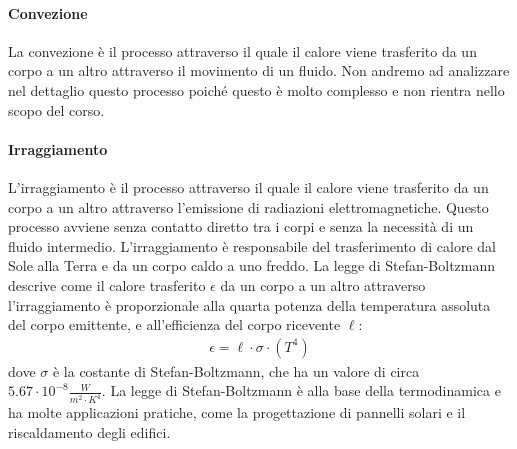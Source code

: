                 \paragraph{Convezione}
                    La convezione è il processo attraverso il quale il calore viene trasferito da un corpo a un altro attraverso il movimento di un fluido. Non andremo ad analizzare nel dettaglio questo processo poiché questo è molto complesso e non rientra nello scopo del corso.
                \paragraph{Irraggiamento}
                    L'irraggiamento è il processo attraverso il quale il calore viene trasferito da un corpo a un altro attraverso l'emissione di radiazioni elettromagnetiche. Questo processo avviene senza contatto diretto tra i corpi e senza la necessità di un fluido intermedio. L'irraggiamento è responsabile del trasferimento di calore dal Sole alla Terra e da un corpo caldo a uno freddo. La legge di Stefan-Boltzmann descrive come il calore trasferito $\epsilon$ da un corpo a un altro attraverso l'irraggiamento è proporzionale alla quarta potenza della temperatura assoluta del corpo emittente, e all'efficienza del corpo ricevente $\ell$:
                    \begin{align*}
                        \epsilon = \ell \cdot \sigma \cdot (T^4)
                    \end{align*}
                    dove $\sigma$ è la costante di Stefan-Boltzmann, che ha un valore di circa $5.67 \cdot 10^{-8} \frac{W}{m^2 \cdot K^4}$. La legge di Stefan-Boltzmann è alla base della termodinamica e ha molte applicazioni pratiche, come la progettazione di pannelli solari e il riscaldamento degli edifici.